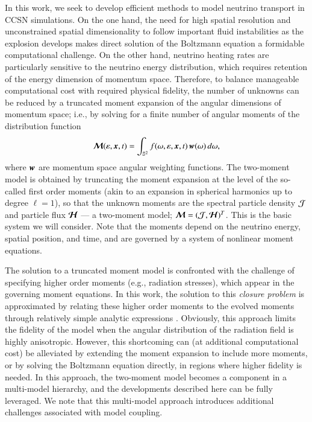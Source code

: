 \documentclass[11pt,letterpaper,twoside,english,final]{article}
\begin{document}
In this work, we seek to develop efficient methods to model neutrino transport in CCSN simulations.  
On the one hand, the need for high spatial resolution and unconstrained spatial dimensionality to follow important fluid instabilities as the explosion develops makes direct solution of the Boltzmann equation a formidable computational challenge.  
On the other hand, neutrino heating rates are particularly sensitive to the neutrino energy distribution, which requires retention of the energy dimension of momentum space.  
Therefore, to balance manageable computational cost with required physical fidelity, the number of unknowns can be reduced by a truncated moment expansion of the angular dimensions of momentum space; i.e., by solving for a finite number of angular moments of the distribution function
\begin{equation}
  \boldsymbol{\mathcal{M}}(\varepsilon,\boldsymbol{x},t)=
  \int_{\mathbb{S}^{2}}f(\omega,\varepsilon,\boldsymbol{x},t)\,\boldsymbol{w}(\omega)\,d\omega,
\end{equation}
where $\boldsymbol{w}$ are momentum space angular weighting functions.  
The two-moment model \citep[e.g.,][]{andersonSpiegel_1972} is obtained by truncating the moment expansion at the level of the so-called first order moments (akin to an expansion in spherical harmonics up to degree $\ell=1$), so that the unknown moments are the spectral particle density $\mathcal{J}$ and particle flux $\boldsymbol{\mathcal{H}}$ --- a two-moment model; $\boldsymbol{\mathcal{M}}=(\mathcal{J},\boldsymbol{\mathcal{H}})^{T}$.  
This is the basic system we will consider.  
Note that the moments depend on the neutrino energy, spatial position, and time, and are governed by a system of nonlinear moment equations.    

The solution to a truncated moment model is confronted with the challenge of specifying higher order moments (e.g., radiation stresses), which appear in the governing moment equations.  
In this work, the solution to this \emph{closure problem} is approximated by relating these higher order moments to the evolved moments through relatively simple analytic expressions \citep[cf.][]{minerbo_1978,levermore_1984,cernohorskyBludman_1994}.  
Obviously, this approach limits the fidelity of the model when the angular distribution of the radiation field is highly anisotropic.  
However, this shortcoming can (at additional computational cost) be alleviated by extending the moment expansion to include more moments, or by solving the Boltzmann equation directly, in regions where higher fidelity is needed.  
In this approach, the two-moment model becomes a component in a multi-model hierarchy, and the developments described here can be fully leveraged.  
We note that this multi-model approach introduces additional challenges associated with model coupling.  
\end{document}
